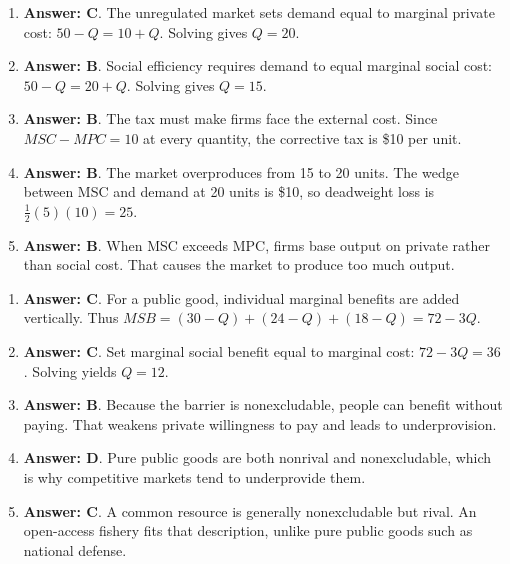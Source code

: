 \documentclass[10pt]{article}
\begin{document}
\begin{enumerate}[resume*=aps, leftmargin=*, itemsep=0.6em, topsep=0.2em, parsep=0pt]
\item \textbf{Answer: C}. The unregulated market sets demand equal to marginal private cost: $50-Q = 10+Q$. Solving gives $Q=20$.
\item \textbf{Answer: B}. Social efficiency requires demand to equal marginal social cost: $50-Q = 20+Q$. Solving gives $Q=15$.
\item \textbf{Answer: B}. The tax must make firms face the external cost. Since $MSC - MPC = 10$ at every quantity, the corrective tax is \$10 per unit.
\item \textbf{Answer: B}. The market overproduces from 15 to 20 units. The wedge between MSC and demand at 20 units is \$10, so deadweight loss is $\tfrac{1}{2}(5)(10)=25$.
\item \textbf{Answer: B}. When MSC exceeds MPC, firms base output on private rather than social cost. That causes the market to produce too much output.
\end{enumerate}
\begin{enumerate}[resume*=aps, leftmargin=*, itemsep=0.6em, topsep=0.2em, parsep=0pt]
\item \textbf{Answer: C}. For a public good, individual marginal benefits are added vertically. Thus $MSB = (30-Q)+(24-Q)+(18-Q) = 72-3Q$.
\item \textbf{Answer: C}. Set marginal social benefit equal to marginal cost: $72 - 3Q = 36$. Solving yields $Q=12$.
\item \textbf{Answer: B}. Because the barrier is nonexcludable, people can benefit without paying. That weakens private willingness to pay and leads to underprovision.
\item \textbf{Answer: D}. Pure public goods are both nonrival and nonexcludable, which is why competitive markets tend to underprovide them.
\item \textbf{Answer: C}. A common resource is generally nonexcludable but rival. An open-access fishery fits that description, unlike pure public goods such as national defense.
\end{enumerate}
\end{document}
